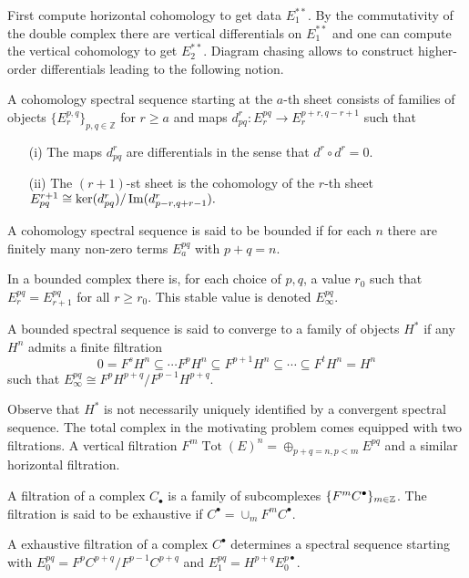 First compute horizontal cohomology to get data $E^{**}_1$.
By the commutativity of the double complex there are vertical differentials on $E^{**}_1$ and one can compute the vertical cohomology to get $E^{**}_2$.
Diagram chasing allows to construct higher-order differentials leading to the following notion.
\begin{definition}
  A cohomology spectral sequence starting at the $a$-th sheet consists of families of objects $ \{E^{p,q}_r\}_{p,q\in \mathbb{Z}}$ for $r\geq a$ and maps
  $d_{pq}^r : E^{pq}_r \to E^{p+r,q-r+1}_r $
  such that
  \begin{enumerate}
    \item[(i)]  The maps $d^r_{pq}$ are differentials in the sense that
    $d^r \circ d^r = 0.$
    \item[(ii)] The $(r+1)$-st sheet is the cohomology of the $r$-th sheet
    $E_{pq}^{r+1} \cong \ker(d_{pq}^r)/ \operatorname{Im}(d_{p-r,q+r-1}^r).$
  \end{enumerate}
\end{definition}
\begin{definition}
  A cohomology spectral sequence is said to be bounded if for each $n$ there are finitely many non-zero terms $E^{pq}_a$ with $p+q = n$.
\end{definition}
In a bounded complex there is, for each choice of $p,q$, a value $r_0$ such that $E_{r}^{pq}= E_{r+1}^{pq}$ for all $r \geq r_0$. This stable value is denoted $E^{pq}_\infty$.
\begin{definition}
  A bounded spectral sequence is said to converge to a family of objects $H^*$ if any $H^n$ admits a finite filtration
  $$0 = F^s H^n \subseteq \cdots F^p H^n \subseteq F^{p+1}H^n \subseteq \cdots \subseteq F^t H^n = H^n $$
  such that $E^{pq}_\infty \cong F^p H^{p+q} / F^{p-1} H^{p+q}$.
\end{definition}
Observe that $H^*$ is not necessarily uniquely identified by a convergent spectral sequence.
The total complex in the motivating problem comes equipped with two filtrations.
A vertical filtration $F^{m} \operatorname{Tot}(E)^n = \oplus_{p+q = n, p <m} E^{pq}$ and a similar horizontal filtration.
\begin{definition}
  A filtration of a complex $C_\bullet$ is a family of subcomplexes $\{F^m C^\bullet\}_{m\in \mathbb{Z}}$.
  The filtration is said to be exhaustive if $C^\bullet = \cup_m F^mC^\bullet$.
\end{definition}
\begin{proposition}
 A exhaustive filtration of a complex $C^\bullet$ determines a spectral sequence starting with $E^{pq}_0 = F^p C^{p+q}/F^{p-1}C^{p+q}$ and $E^{pq}_1= H^{p+q} E^{p\bullet}_0$.
\end{proposition}

